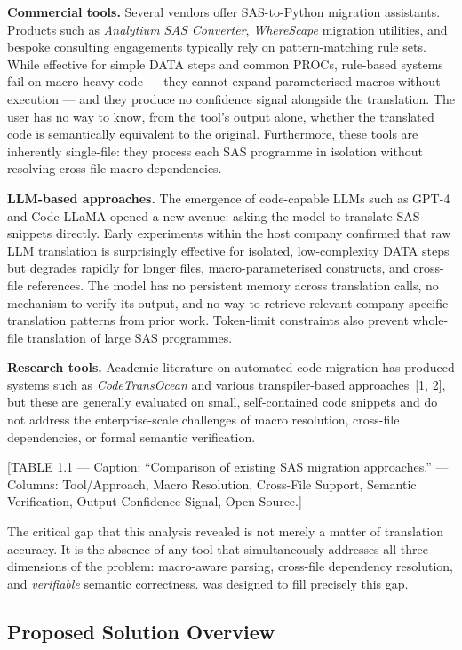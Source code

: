 \textbf{Commercial tools.} Several vendors offer SAS-to-Python migration
assistants. Products such as \textit{Analytium SAS Converter},
\textit{WhereScape} migration utilities, and bespoke consulting engagements
typically rely on pattern-matching rule sets. While effective for simple DATA
steps and common PROCs, rule-based systems fail on macro-heavy code --- they
cannot expand parameterised macros without execution --- and they produce no
confidence signal alongside the translation. The user has no way to know, from
the tool's output alone, whether the translated code is semantically equivalent
to the original. Furthermore, these tools are inherently single-file: they
process each SAS programme in isolation without resolving cross-file macro
dependencies.

\textbf{\ac{LLM}-based approaches.} The emergence of code-capable \acp{LLM}
such as GPT-4 and Code LLaMA opened a new avenue: asking the model to translate
SAS snippets directly. Early experiments within the host company confirmed that
raw LLM translation is surprisingly effective for isolated, low-complexity DATA
steps but degrades rapidly for longer files, macro-parameterised constructs, and
cross-file references. The model has no persistent memory across translation
calls, no mechanism to verify its output, and no way to retrieve relevant
company-specific translation patterns from prior work. Token-limit constraints
also prevent whole-file translation of large SAS programmes.

\textbf{Research tools.} Academic literature on automated code migration has
produced systems such as \textit{CodeTransOcean} and various
transpiler-based approaches~[1, 2], but these are generally evaluated on
small, self-contained code snippets and do not address the enterprise-scale
challenges of macro resolution, cross-file dependencies, or formal semantic
verification.

[TABLE 1.1 --- Caption: ``Comparison of existing SAS migration approaches.''
--- Columns: Tool/Approach, Macro Resolution, Cross-File Support, Semantic
Verification, Output Confidence Signal, Open Source.]

The critical gap that this analysis revealed is not merely a matter of
translation accuracy. It is the absence of any tool that simultaneously
addresses all three dimensions of the problem: macro-aware parsing, cross-file
dependency resolution, and \emph{verifiable} semantic correctness. \codara{}
was designed to fill precisely this gap.

\subsection{Proposed Solution Overview}
\label{subsec:proposed-solution}


